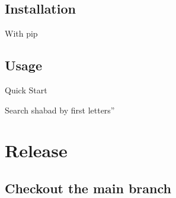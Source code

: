 \documentclass[letterpaper,10pt,english]{sphinxmanual}
\begin{document}
\subsection{Installation}
\label{\detokenize{index:installation}}
\sphinxAtStartPar
With pip

\begin{sphinxVerbatim}[commandchars=\\\{\}]
  
\end{sphinxVerbatim}


\subsection{Usage}
\label{\detokenize{index:usage}}
\sphinxAtStartPar
Quick Start

\begin{sphinxVerbatim}[commandchars=\\\{\}]
  
\end{sphinxVerbatim}

\sphinxAtStartPar
Search shabad by first letters”

\begin{sphinxVerbatim}[commandchars=\\\{\}]
  
\end{sphinxVerbatim}


\section{Release}
\label{\detokenize{index:release}}

\subsection{Checkout the main branch}
\label{\detokenize{index:checkout-the-main-branch}}
\begin{sphinxVerbatim}[commandchars=\\\{\}]
  
 
\end{sphinxVerbatim}
\end{document}
